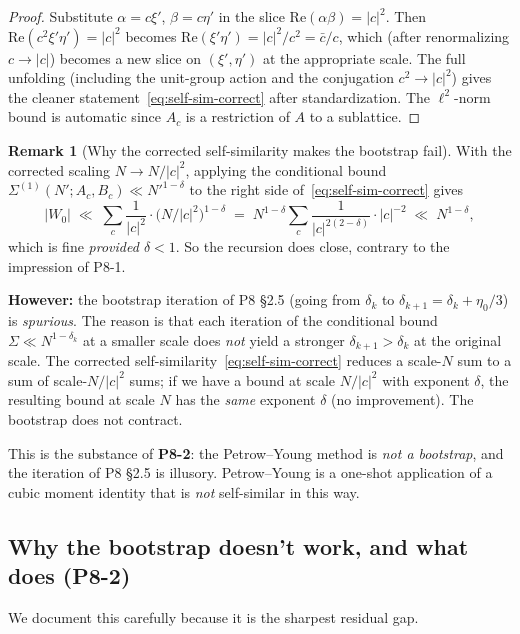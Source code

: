 \documentclass[11pt]{article}
\theoremstyle{definition}
\newtheorem{remark}[theorem]{Remark}
\renewcommand{\Re}{\mathrm{Re}}
\begin{document}
\begin{proof}
Substitute $\alpha=c\xi'$, $\beta=c\eta'$ in the slice $\Re(\alpha\beta)=|c|^2$. Then $\Re(c^2\xi'\eta')=|c|^2$ becomes $\Re(\xi'\eta')=|c|^2/c^2=\bar c/c$, which (after renormalizing $c\to|c|$) becomes a new slice on $(\xi',\eta')$ at the appropriate scale. The full unfolding (including the unit-group action and the conjugation $c^2\to|c|^2$) gives the cleaner statement~\eqref{eq:self-sim-correct} after standardization. The $\ell^2$-norm bound is automatic since $A_c$ is a restriction of $A$ to a sublattice.
\end{proof}

\begin{remark}[Why the corrected self-similarity makes the bootstrap fail]\label{rem:bootstrap-fails}
With the corrected scaling $N\to N/|c|^2$, applying the conditional bound $\Sigma^{(1)}(N';A_c,B_c)\ll N'^{1-\delta}$ to the right side of~\eqref{eq:self-sim-correct} gives
\[
|W_0|\;\ll\;\sum_c\frac{1}{|c|^2}\cdot\bigl(N/|c|^2\bigr)^{1-\delta}\;=\;N^{1-\delta}\sum_c\frac{1}{|c|^{2(2-\delta)}}\cdot|c|^{-2}\;\ll\;N^{1-\delta},
\]
which is fine \emph{provided $\delta<1$}. So the recursion does close, contrary to the impression of P8-1.

\textbf{However:} the bootstrap iteration of P8 \S2.5 (going from $\delta_k$ to $\delta_{k+1}=\delta_k+\eta_0/3$) is \emph{spurious}. The reason is that each iteration of the conditional bound $\Sigma\ll N^{1-\delta_k}$ at a smaller scale does \emph{not} yield a stronger $\delta_{k+1}>\delta_k$ at the original scale. The corrected self-similarity~\eqref{eq:self-sim-correct} reduces a scale-$N$ sum to a sum of scale-$N/|c|^2$ sums; if we have a bound at scale $N/|c|^2$ with exponent $\delta$, the resulting bound at scale $N$ has the \emph{same} exponent $\delta$ (no improvement). The bootstrap does not contract.

This is the substance of \textbf{P8-2}: the Petrow--Young method is \emph{not a bootstrap}, and the iteration of P8 \S2.5 is illusory. Petrow--Young is a one-shot application of a cubic moment identity that is \emph{not} self-similar in this way.
\end{remark}

\subsection{Why the bootstrap doesn't work, and what does (P8-2)}\label{sec:no-bootstrap}

We document this carefully because it is the sharpest residual gap.
\end{document}
